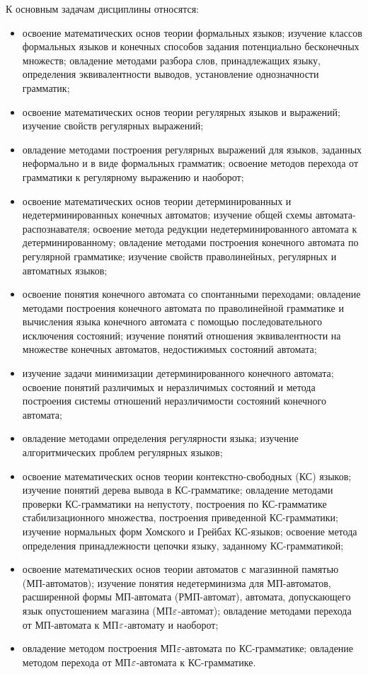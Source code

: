 К основным задачам дисциплины относятся: 
\begin{itemize}
\item освоение математических основ теории формальных языков; изучение классов формальных языков и конечных способов задания потенциально бесконечных множеств; овладение методами разбора слов, принадлежащих языку, определения эквивалентности выводов, установление однозначности грамматик;
\item освоение математических основ теории регулярных языков и выражений; изучение свойств регулярных выражений; \item овладение методами построения регулярных выражений для языков, заданных неформально и в виде формальных грамматик; освоение методов перехода от грамматики к регулярному выражению и наоборот;
\item освоение математических основ теории детерминированных и недетерминированных конечных автоматов; изучение общей схемы автомата-распознавателя; освоение метода редукции недетерминированного автомата к детерминированному; овладение методами построения конечного автомата по регулярной грамматике; изучение свойств праволинейных, регулярных и автоматных языков;
\item освоение понятия конечного автомата со спонтанными переходами; овладение методами построения конечного автомата по праволинейной грамматике и вычисления языка конечного автомата с помощью последовательного исключения состояний; изучение понятий отношения эквивалентности на множестве конечных автоматов, недостижимых состояний автомата;
\item изучение задачи минимизации детерминированного конечного автомата; освоение понятий различимых и неразличимых состояний и метода построения системы отношений неразличимости состояний конечного автомата; 
\item овладение методами определения регулярности языка; изучение алгоритмических проблем регулярных языков;
\item освоение математических основ теории контекстно-свободных (КС) языков; изучение понятий дерева вывода в КС-грамматике; овладение методами проверки КС-грамматики на непустоту, построения по КС-грамматике стабилизационного множества, построения приведенной КС-грамматики; изучение нормальных форм Хомского и Грейбах КС-языков; освоение метода определения принадлежности цепочки языку, заданному КС-грамматикой;
\item освоение математических основ теории автоматов с магазинной памятью (МП-автоматов); изучение понятия недетерминизма для МП-автоматов, расширенной формы МП-автомата (РМП-автомат), автомата, допускающего язык опустошением магазина (МП$\varepsilon$-автомат); овладение методами перехода от МП-автомата к МП$\varepsilon$-автомату и наоборот; 
\item овладение методом построения МП$\varepsilon$-автомата по КС-грамматике; овладение методом перехода от МП$\varepsilon$-автомата к КС-грамматике. 
\end{itemize}

